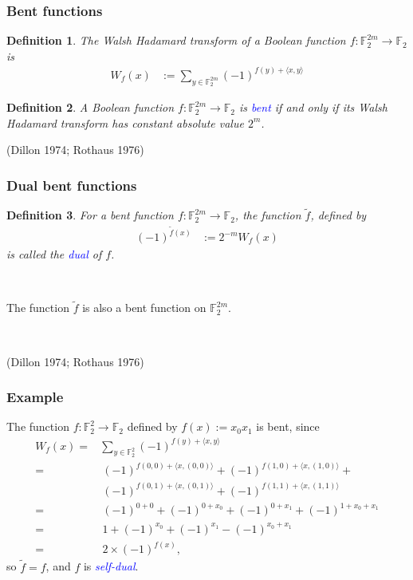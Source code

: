 \documentclass[pdf,sprung,slideColor,nocolorBG]{beamer}
\newenvironment{colortheme}[1]{
\def\ProvidesPackageRCS $##1${\relax}
\renewcommand{\ProcessOptions}{\relax}
\makeatletter

\makeatother
}{}
\newcommand{\slidecite}[1]{\tiny{(#1)}\normalsize{}}
\newcommand{\mb}[1]{\mathbb{#1}}
\newcommand{\Emph}[1]{\emph{\textcolor{blue}{#1}}}
\newcommand{\To}{\rightarrow}
\newcommand{\dual}[1]{\widetilde{#1}}
\newcommand{\F}{\mb{F}}
\newtheorem{Def}{Definition}
\begin{document}
\begin{colortheme}{seagull}

\begin{frame}
\frametitle{Bent functions}
\begin{Def}
\label{def-Walsh-Hadamard-transform}
The Walsh Hadamard transform of
a Boolean function $f : \F_2^{2m} \To \F_2$ is
\begin{align*}
W_f(x)
&:=
\sum_{y \in \F_2^{2m}} (-1)^{f(y) + \langle x, y \rangle}
\end{align*}
\end{Def}

\begin{Def}
\label{def-Bent-function}
A Boolean function $f : \F_2^{2m} \To \F_2$ is \Emph{bent}
if and only if its Walsh Hada\-mard transform has constant absolute value $2^{m}$.
\end{Def}
\slidecite{Dillon 1974; Rothaus 1976}
\end{frame}
\begin{frame}
\frametitle{Dual bent functions}

\begin{Def}
\label{def-dual-Bent-function}
For a bent function  $f : \F_2^{2m} \To \F_2$, the function $\dual{f}$, defined by
\begin{align*}
(-1)^{\dual{f}(x)} &:= 2^{-m} W_f(x)
\end{align*}
is called the \Emph{dual} of $f$.
\end{Def}

~

The function $\dual{f}$ is also a bent function on $\F_2^{2m}$.

~

\slidecite{Dillon 1974; Rothaus 1976}
\end{frame}

\begin{frame}
\frametitle{Example}

The function  $f : \F_2^2 \To \F_2$  defined by $f(x) := x_0 x_1$
is bent, since
\begin{align*}
W_f(x)
=&
\sum_{y \in \F_2^2} (-1)^{f(y) + \langle x, y \rangle}
\\
=&\ (-1)^{f(0,0) + \langle x, (0,0) \rangle}
 + (-1)^{f(1,0) + \langle x, (1,0) \rangle} +
\\
\phantom{=}&\ (-1)^{f(0,1) + \langle x, (0,1) \rangle}
 + (-1)^{f(1,1) + \langle x, (1,1) \rangle}
\\
=&\ (-1)^{0 + 0} + (-1)^{0 + x_0} + (-1)^{0 + x_1} + (-1)^{1 + x_0 + x_1}
\\
=&\ 1 + (-1)^{x_0} + (-1)^{x_1} - (-1)^{x_0 + x_1}
\\
=&\ 2 \times (-1)^{f(x)},
\end{align*}
so $\dual{f} = f$, and $f$ is \Emph{self-dual}.
%
\end{frame}


\end{colortheme}
\end{document}
